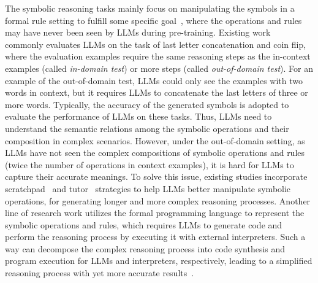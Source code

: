 {
The symbolic reasoning tasks mainly focus on manipulating the  symbols in a formal rule setting to fulfill some specific goal~\cite{Huang-arxiv-2022-Towards}, where the operations and rules may have never been seen by LLMs during pre-training. }
{
Existing work~\cite{Wei-arxiv-2022-chain,Kojima-arxiv-2022-Large,Zhou-arxiv-2022-Least} commonly evaluates LLMs on the task of last letter concatenation and coin flip, where the evaluation examples require the same reasoning steps as the in-context examples (called \emph{in-domain test}) or more steps (called \emph{out-of-domain test}).
For an example of the out-of-domain test, LLMs could only see the examples with two  words in context, but it requires LLMs to concatenate the last letters of three or more words.
Typically, the accuracy of the generated symbols is adopted to evaluate the performance of LLMs on these tasks.} 
Thus, LLMs need to understand the semantic relations among the symbolic operations and  %
{their composition in complex scenarios. 
However, under the out-of-domain setting, as LLMs have not seen the complex compositions of symbolic operations and rules (\eg twice the number of operations in context examples), it is hard for LLMs to capture their accurate meanings.} 
To solve this issue, existing studies incorporate scratchpad~\cite{Anil-arxiv-2022-Exploring,Nye-arxiv-2021-Show} and tutor~\cite{Qian-arxiv-2022-Limitations} strategies to help LLMs better manipulate symbolic operations, for generating longer and more complex reasoning processes.
Another line of research work utilizes the formal programming language to represent the symbolic operations and rules, which requires LLMs to generate code and perform the reasoning process by executing it with external interpreters.
Such a way can decompose the complex reasoning process into code synthesis and program execution for LLMs and interpreters, respectively, leading to a simplified  reasoning process with yet more accurate results~\cite{Gao-arxiv-2022-PAL}.


